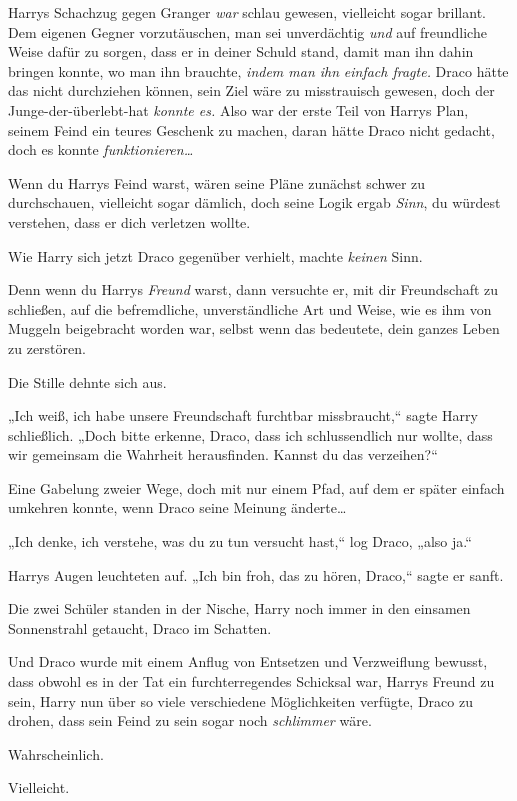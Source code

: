 {Harrys Schachzug gegen Granger \emph{war} schlau gewesen, vielleicht sogar brillant. Dem eigenen Gegner vorzutäuschen, man sei unverdächtig \emph{und} auf freundliche Weise dafür zu sorgen, dass er in deiner Schuld stand, damit man ihn dahin bringen konnte, wo man ihn brauchte, \emph{indem man ihn} \emph{einfach fragte.} Draco hätte das nicht durchziehen können, sein Ziel wäre zu misstrauisch gewesen, doch der Junge-der-überlebt-hat \emph{konnte es.} Also war der erste Teil von Harrys Plan, seinem Feind ein teures Geschenk zu machen, daran hätte Draco nicht gedacht, doch es konnte \emph{funktionieren…}

Wenn du Harrys Feind warst, wären seine Pläne zunächst schwer zu durchschauen, vielleicht sogar dämlich, doch seine Logik ergab \emph{Sinn}, du würdest verstehen, dass er dich verletzen wollte.

Wie Harry sich jetzt Draco gegenüber verhielt, machte \emph{keinen} Sinn.

Denn wenn du Harrys \emph{Freund} warst, dann versuchte er, mit dir Freundschaft zu schließen, auf die befremdliche, unverständliche Art und Weise, wie es ihm von Muggeln beigebracht worden war, selbst wenn das bedeutete, dein ganzes Leben zu zerstören.

Die Stille dehnte sich aus.

„Ich weiß, ich habe unsere Freundschaft furchtbar missbraucht,“ sagte Harry schließlich. „Doch bitte erkenne, Draco, dass ich schlussendlich nur wollte, dass wir gemeinsam die Wahrheit herausfinden. Kannst du das verzeihen?“

Eine Gabelung zweier Wege, doch mit nur einem Pfad, auf dem er später einfach umkehren konnte, wenn Draco seine Meinung änderte…

„Ich denke, ich verstehe, was du zu tun versucht hast,“ log Draco, „also ja.“

Harrys Augen leuchteten auf. „Ich bin froh, das zu hören, Draco,“ sagte er sanft.

Die zwei Schüler standen in der Nische, Harry noch immer in den einsamen Sonnenstrahl getaucht, Draco im Schatten.

Und Draco wurde mit einem Anflug von Entsetzen und Verzweiflung bewusst, dass obwohl es in der Tat ein furchterregendes Schicksal war, Harrys Freund zu sein, Harry nun über so viele verschiedene Möglichkeiten verfügte, Draco zu drohen, dass sein Feind zu sein sogar noch \emph{schlimmer} wäre.

Wahrscheinlich.

Vielleicht.

}
